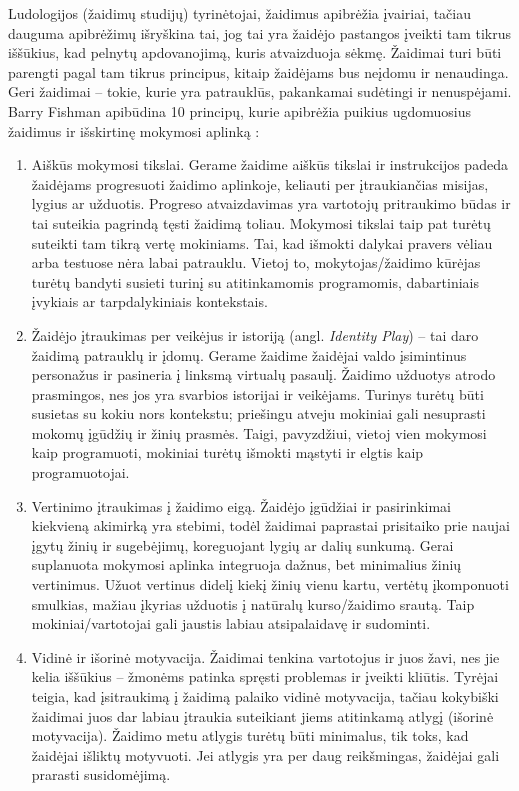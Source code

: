 \documentclass{VUMIFPSkursinis}
\begin{document}
Ludologijos (žaidimų studijų) tyrinėtojai, žaidimus apibrėžia įvairiai, tačiau dauguma apibrėžimų išryškina tai, jog tai yra žaidėjo pastangos įveikti tam tikrus iššūkius, kad pelnytų apdovanojimą, kuris atvaizduoja sėkmę. Žaidimai turi būti parengti pagal tam tikrus principus, kitaip žaidėjams bus neįdomu ir nenaudinga. Geri žaidimai -- tokie, kurie yra patrauklūs, pakankamai sudėtingi ir nenuspėjami. Barry Fishman apibūdina 10 principų, kurie apibrėžia puikius ugdomuosius žaidimus ir išskirtinę mokymosi aplinką \cite{aguilar2018game}:
\begin{enumerate}
    \item Aiškūs mokymosi tikslai. Gerame žaidime aiškūs tikslai ir instrukcijos padeda žaidėjams progresuoti žaidimo aplinkoje, keliauti per įtraukiančias misijas, lygius ar užduotis. Progreso atvaizdavimas yra vartotojų pritraukimo būdas ir tai suteikia pagrindą tęsti žaidimą toliau. Mokymosi tikslai taip pat turėtų suteikti tam tikrą vertę mokiniams. Tai, kad išmokti dalykai pravers vėliau arba testuose nėra labai patrauklu. Vietoj to, mokytojas/žaidimo kūrėjas turėtų bandyti susieti turinį su atitinkamomis programomis, dabartiniais įvykiais ar tarpdalykiniais kontekstais.
    \item Žaidėjo įtraukimas per veikėjus ir istoriją (angl. \textit{Identity Play}) -- tai daro žaidimą patrauklų ir įdomų. Gerame žaidime žaidėjai valdo įsimintinus personažus ir pasineria į linksmą virtualų pasaulį. Žaidimo užduotys atrodo prasmingos, nes jos yra svarbios istorijai ir veikėjams. Turinys turėtų būti susietas su kokiu nors kontekstu; priešingu atveju mokiniai gali nesuprasti mokomų įgūdžių ir žinių prasmės. Taigi, pavyzdžiui, vietoj vien mokymosi kaip programuoti, mokiniai turėtų išmokti mąstyti ir elgtis kaip programuotojai.
    \item Vertinimo įtraukimas į žaidimo eigą. Žaidėjo įgūdžiai ir pasirinkimai kiekvieną akimirką yra stebimi, todėl žaidimai paprastai prisitaiko prie naujai įgytų žinių ir sugebėjimų, koreguojant lygių ar dalių sunkumą. Gerai suplanuota mokymosi aplinka integruoja dažnus, bet minimalius žinių vertinimus. Užuot vertinus didelį kiekį žinių vienu kartu, vertėtų įkomponuoti smulkias, mažiau įkyrias užduotis į natūralų kurso/žaidimo srautą. Taip mokiniai/vartotojai gali jaustis labiau atsipalaidavę ir sudominti.
    \item Vidinė ir išorinė motyvacija. Žaidimai tenkina vartotojus ir juos žavi, nes jie kelia iššūkius -- žmonėms patinka spręsti problemas ir įveikti kliūtis. Tyrėjai teigia, kad įsitraukimą į žaidimą palaiko vidinė motyvacija, tačiau kokybiški žaidimai juos dar labiau įtraukia suteikiant jiems atitinkamą atlygį (išorinė motyvacija). Žaidimo metu atlygis turėtų būti minimalus, tik toks, kad žaidėjai išliktų motyvuoti. Jei atlygis yra per daug reikšmingas, žaidėjai gali prarasti susidomėjimą. \cite{pavluswe}

\end{enumerate}
\end{document}
